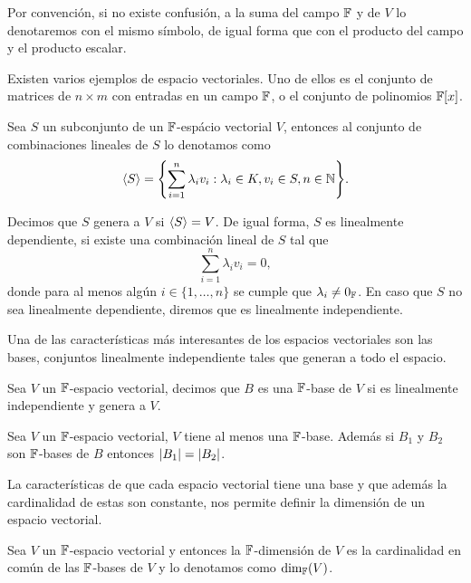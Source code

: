 \documentclass[11pt]{report}
\begin{document}
Por convención, si no existe confusión, a la suma del campo $\mathbb{F}$ y de $V$ lo denotaremos con el mismo símbolo, de igual forma que con el producto del campo y el producto escalar.

Existen varios ejemplos de espacio vectoriales. Uno de ellos es el conjunto de matrices de $n \times m $ con entradas en un campo $\mathbb{F}$, o el conjunto de polinomios $\mathbb{F}[x]$.

\begin{defi}
  Sea $S$ un subconjunto de un $\mathbb{F}$-espácio vectorial $V$, entonces al conjunto de combinaciones lineales de $S$ lo denotamos como
  \[ \inner{S} = \set{ \sum_{i=1}^n \lambda_i v_i : \lambda_i \in K,  v_i \in S, n \in \N  }. \]

  Decimos que $S$ genera a $V$ si $\langle S\rangle = V$. De igual forma, $S$ es linealmente dependiente, si existe una combinación lineal de $S$ tal que
  \[ \sum_{i=1}^n \lambda_i v_i = 0, \]
  donde para al menos algún $i \in \{1,\ldots,n\}$ se cumple que $\lambda_i \neq 0_{\mathbb{F}}$. En caso que $S$ no sea linealmente dependiente, diremos que es linealmente independiente.
\end{defi}

Una de las características más interesantes de los espacios vectoriales son las bases, conjuntos linealmente independiente tales que generan a todo el espacio.
\begin{defi}
  Sea $V$ un $\mathbb{F}$-espacio vectorial, decimos que $B$ es una $\mathbb{F}$-base de $V$ si es linealmente independiente y genera a $V$.
\end{defi}

\begin{teor}
  Sea $V$ un $\mathbb{F}$-espacio vectorial, $V$ tiene al menos una $\mathbb{F}$-base. Además si $B_1$ y $B_2$ son $\mathbb{F}$-bases de $B$ entonces $\mathopen|B_1\mathclose| = \mathopen|B_2\mathclose|$.
\end{teor}

La características de que cada espacio vectorial tiene una base y que además la cardinalidad de estas son constante, nos permite definir la dimensión de un espacio vectorial.

\begin{defi}
  Sea $V$ un $\mathbb{F}$-espacio vectorial y entonces la $\mathbb{F}$-dimensión de $V$ es la cardinalidad en común de las $\mathbb{F}$-bases de $V$ y lo denotamos como $\dim_{\mathbb{F}}(V)$.
\end{defi}
\end{document}

